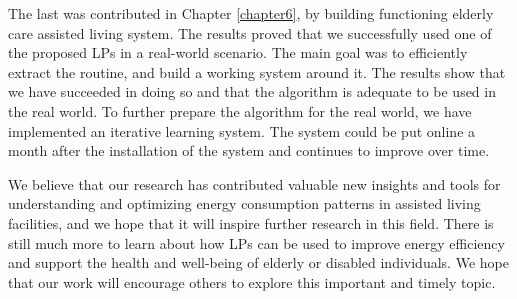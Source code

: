 The last was contributed in Chapter \ref{chapter6}, by building functioning elderly care assisted living system. 
The results proved that we successfully used one of the proposed LPs in a real-world scenario. 
The main goal was to efficiently extract the routine, and build a working system around it.
The results show that we have succeeded in doing so and that the algorithm is adequate to be used in the real world.
To further prepare the algorithm for the real world, we have implemented an iterative learning system.
The system could be put online a month after the installation of the system and continues to improve over time.

We believe that our research has contributed valuable new insights and tools for understanding and optimizing energy consumption patterns in assisted living facilities,
and we hope that it will inspire further research in this field. 
There is still much more to learn about how LPs can be used to improve energy efficiency and support the health and well-being of elderly or disabled individuals.
We hope that our work will encourage others to explore this important and timely topic.



